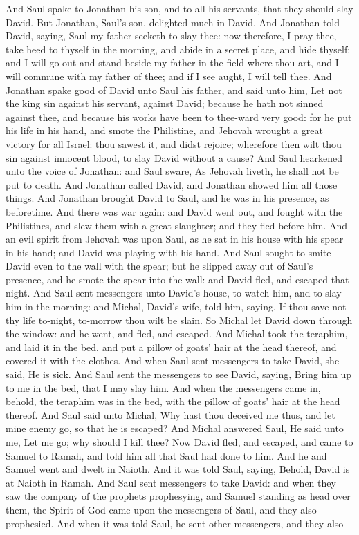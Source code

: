 And Saul spake to Jonathan his son, and to all his servants, that they should slay David. But Jonathan, Saul’s son, delighted much in David. And Jonathan told David, saying, Saul my father seeketh to slay thee: now therefore, I pray thee, take heed to thyself in the morning, and abide in a secret place, and hide thyself: and I will go out and stand beside my father in the field where thou art, and I will commune with my father of thee; and if I see aught, I will tell thee. And Jonathan spake good of David unto Saul his father, and said unto him, Let not the king sin against his servant, against David; because he hath not sinned against thee, and because his works have been to thee-ward very good: for he put his life in his hand, and smote the Philistine, and Jehovah wrought a great victory for all Israel: thou sawest it, and didst rejoice; wherefore then wilt thou sin against innocent blood, to slay David without a cause? And Saul hearkened unto the voice of Jonathan: and Saul sware, As Jehovah liveth, he shall not be put to death. And Jonathan called David, and Jonathan showed him all those things. And Jonathan brought David to Saul, and he was in his presence, as beforetime.  And there was war again: and David went out, and fought with the Philistines, and slew them with a great slaughter; and they fled before him. And an evil spirit from Jehovah was upon Saul, as he sat in his house with his spear in his hand; and David was playing with his hand. And Saul sought to smite David even to the wall with the spear; but he slipped away out of Saul’s presence, and he smote the spear into the wall: and David fled, and escaped that night. And Saul sent messengers unto David’s house, to watch him, and to slay him in the morning: and Michal, David’s wife, told him, saying, If thou save not thy life to-night, to-morrow thou wilt be slain. So Michal let David down through the window: and he went, and fled, and escaped. And Michal took the teraphim, and laid it in the bed, and put a pillow of goats’ hair at the head thereof, and covered it with the clothes. And when Saul sent messengers to take David, she said, He is sick. And Saul sent the messengers to see David, saying, Bring him up to me in the bed, that I may slay him. And when the messengers came in, behold, the teraphim was in the bed, with the pillow of goats’ hair at the head thereof. And Saul said unto Michal, Why hast thou deceived me thus, and let mine enemy go, so that he is escaped? And Michal answered Saul, He said unto me, Let me go; why should I kill thee?  Now David fled, and escaped, and came to Samuel to Ramah, and told him all that Saul had done to him. And he and Samuel went and dwelt in Naioth. And it was told Saul, saying, Behold, David is at Naioth in Ramah. And Saul sent messengers to take David: and when they saw the company of the prophets prophesying, and Samuel standing as head over them, the Spirit of God came upon the messengers of Saul, and they also prophesied. And when it was told Saul, he sent other messengers, and they also 